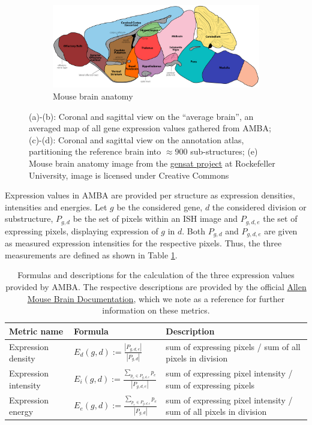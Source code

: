 \documentclass[]{article}
\begin{document}
\begin{figure}
	\begin{subfigure}{0.9\textwidth}
		\centering
		\includegraphics[width=.8\linewidth]{figures/ADULT_ATLAS.jpg}
		\caption{Mouse brain anatomy }
		\label{fig:mousebrain_anatomy}
	\end{subfigure}
	\caption[Average, annotation and anatomy atlas]{(a)-(b): Coronal and sagittal view on the ``average brain'', an averaged map of all gene expression values gathered from AMBA; (c)-(d): Coronal and sagittal view on the annotation atlas, partitioning the reference brain into $\approx900$ sub-structures; (e) Mouse brain anatomy image from the \href{http://www.gensat.org/}{gensat project} at Rockefeller University, image is licensed under Creative Commons}
	\label{fig:CCF_images}
\end{figure}

Expression values in AMBA are provided per structure as expression densities, intensities and energies. Let $g$ be the considered gene, $d$ the considered division or substructure, $P_{g,d}$ be the set of pixels within an ISH image and $P_{g,d,e}$ the set of expressing pixels, displaying expression of $g$ in $d$. Both $P_{g,d}$ and $P_{g,d,e}$ are given as measured expression intensities for the respective pixels. Thus, the three measurements are defined as shown in Table \ref{tab:expr_values}.

\begin{table}
	\renewcommand{\arraystretch}{3}
	\begin{tabular}{llp{8cm}}
		Metric name&Formula&Description\\
		\hline
		Expression density&$E_d(g,d):=\frac{|P_{g,d,e}|}{|P_{g,d}|}$&sum of expressing pixels / sum of all pixels in division\\
		Expression intensity&$E_i(g,d):=\frac{\sum_{p_e\in P_{g,d,e}} p_e}{|P_{g,d,e}|}$&sum of expressing pixel intensity / sum of expressing pixels\\
		Expression energy&$E_e(g,d):=\frac{\sum_{p_e\in P_{g,d,e}} p_e}{|P_{g,d}|}$&sum of expressing pixel intensity / sum of all pixels in division\\
	\end{tabular}

	\caption[Formulas and descriptions for the calculation of the three expression values provided by AMBA]{Formulas and descriptions for the calculation of the three expression values provided by AMBA. The respective descriptions are provided by the official \href{http://help.brain-map.org/download/attachments/2818169/InformaticsDataProcessing.pdf?version=1&modificationDate=1319667590884&api=v2}{Allen Mouse Brain Documentation}, which we note as a reference for further information on these metrics.}
	\label{tab:expr_values}
\end{table}
\end{document}

